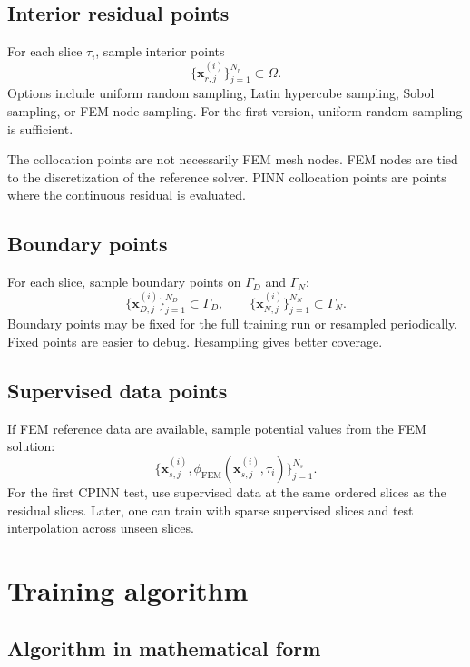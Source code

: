 \documentclass[11pt]{article}
\newcommand{\xv}{\bm{x}}
\newcommand{\Om}{\Omega}
\newcommand{\taud}{\tau}
\begin{document}
\subsection{Interior residual points}

For each slice $\taud_i$, sample interior points
\begin{equation}
\{\xv_{r,j}^{(i)}\}_{j=1}^{N_r}\subset\Om.
\end{equation}
Options include uniform random sampling, Latin hypercube sampling, Sobol sampling, or FEM-node sampling. For the first version, uniform random sampling is sufficient.

The collocation points are not necessarily FEM mesh nodes. FEM nodes are tied to the discretization of the reference solver. PINN collocation points are points where the continuous residual is evaluated.

\subsection{Boundary points}

For each slice, sample boundary points on $\Gamma_D$ and $\Gamma_N$:
\begin{equation}
\{\xv_{D,j}^{(i)}\}_{j=1}^{N_D}\subset\Gamma_D,
\qquad
\{\xv_{N,j}^{(i)}\}_{j=1}^{N_N}\subset\Gamma_N.
\end{equation}
Boundary points may be fixed for the full training run or resampled periodically. Fixed points are easier to debug. Resampling gives better coverage.

\subsection{Supervised data points}

If FEM reference data are available, sample potential values from the FEM solution:
\begin{equation}
\{\xv_{s,j}^{(i)},\phi_{\mathrm{FEM}}(\xv_{s,j}^{(i)},\taud_i)\}_{j=1}^{N_s}.
\end{equation}
For the first CPINN test, use supervised data at the same ordered slices as the residual slices. Later, one can train with sparse supervised slices and test interpolation across unseen slices.

\section{Training algorithm}

\subsection{Algorithm in mathematical form}
\end{document}
